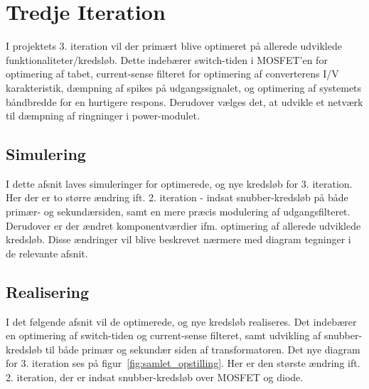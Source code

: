
\chapter{Tredje Iteration}
I projektets 3. iteration vil der primært blive optimeret på allerede udviklede funktionaliteter/kredsløb. Dette indebærer switch-tiden i MOSFET'en for optimering af tabet, current-sense filteret for optimering af converterens I/V karakteristik, dæmpning af spikes på udgangssignalet, og optimering af systemets båndbredde for en hurtigere respons. Derudover vælges det, at udvikle et netværk til dæmpning af ringninger i power-modulet. 













\clearpage

\section{Simulering}
I dette afsnit laves simuleringer for optimerede, og nye kredsløb for 3. iteration. Her der er to større ændring ift. 2. iteration - indsat snubber-kredsløb på både primær- og sekundærsiden, samt en mere præcis modulering af udgangsfilteret. Derudover er der ændret komponentværdier ifm. optimering af allerede udviklede kredsløb. Disse ændringer vil blive beskrevet nærmere med diagram tegninger i de relevante afsnit. 















\clearpage

\section{Realisering}
I det følgende afsnit vil de optimerede, og nye kredsløb realiseres. Det indebærer en optimering af switch-tiden og current-sense filteret, samt udvikling af snubber-kredsløb til både primær og sekundær siden af transformatoren. Det nye diagram for 3. iteration ses på figur~\ref{fig:samlet_opstilling}. Her er den største ændring ift. 2. iteration, der er indsat snubber-kredsløb over MOSFET og diode.

